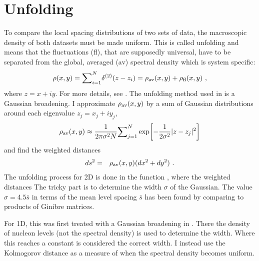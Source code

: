 \documentclass[a4paper,11pt]{article}
\numberwithin{equation}{section}
\begin{document}
\section{Unfolding}
To compare the local spacing distributions of two sets of data, the macroscopic density of both datasets must be made uniform. This is called unfolding and means that the fluctuations (fl), that are supposedly universal, have to be separated from the global, averaged (av) spectral density which is system specific: 
\begin{equation}
\label{rhosplit}
\rho(x,y)={\sum}_{i=1}^N\delta^{(2)}(z-z_i)=\rho_{\rm av}(x,y)+ \rho_{\rm fl}(x,y)\ ,
\end{equation}
where $z=x+iy$. For more details, see \cite{PhD_AM,AKMP}. The unfolding method used in \cite{AKMP,Buzzard} is a Gaussian broadening. I approximate $\rho_{\rm av}(x,y)$ by a sum of Gaussian distributions around each eigenvalue $z_j = x_j + iy_j$,
\begin{equation}
\label{unfold}
\rho_{\rm av}(x,y)\approx \frac{1}{2\pi\sigma^2 N}{\sum}_{j=1}^N\exp\biggl[-\frac{1}{2\sigma^2}|z-z_j|^2
\biggl]
\end{equation}
and find the weighted distances
\begin{eqnarray}
ds^2 &=& \rho_{\rm av}(x,y)(dx^2+dy^2)\ .
\end{eqnarray}
The unfolding process for 2D is done in the function \fileUnfoldingGaussian, where the weighted distances 
The tricky part is to determine the width $\sigma$ of the Gaussian. The value $\sigma = 4.5\bar{s}$ in terms of the mean level spacing $\bar{s}$ has been found by comparing to products of Ginibre matrices.

For 1D, this was first treated with a Gaussian broadening in \cite{Strutinsky}. There the density of nucleon levels (not the spectral density) is used to determine the width. Where this reaches a constant is considered the correct width. I instead use the Kolmogorov distance as a measure of when the spectral density becomes uniform.
\end{document}
